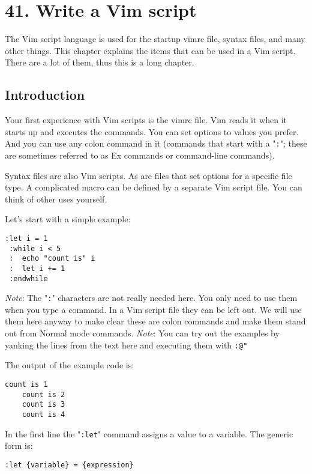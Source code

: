 \section{41. Write a Vim script}
\label{Write a Vim script}
The Vim script language is used for the startup vimrc file, syntax files, and many other things.
This chapter explains the items that can be used in a Vim script.
There are a lot of them, thus this is a long chapter.
\subsection{Introduction}
\label{vim-script-intro}
\label{script}
Your first experience with Vim scripts is the vimrc file.
Vim reads it when it starts up and executes the commands.
You can set options to values you prefer.
And you can use any colon command in it (commands that start with a "\texttt{:}"; these are sometimes referred to as Ex commands or command-line commands).

Syntax files are also Vim scripts.
As are files that set options for a specific file type.
A complicated macro can be defined by a separate Vim script file.
You can think of other uses yourself.

Let's start with a simple example:

\begin{Verbatim}[samepage=true]
 :let i = 1
 :while i < 5
 :  echo "count is" i
 :  let i += 1
 :endwhile
\end{Verbatim}

\emph{Note}: The "\texttt{:}" characters are not really needed here.
You only need to use them when you type a command.
In a Vim script file they can be left out.
We will use them here anyway to make clear these are colon commands and make them stand out from Normal mode commands.
\emph{Note}: You can try out the examples by yanking the lines from the text here and executing them with \texttt{:@"}

The output of the example code is:

\begin{Verbatim}[samepage=true]
    count is 1
    count is 2
    count is 3
    count is 4
\end{Verbatim}

In the first line the "\texttt{:let}" command assigns a value to a variable.
The generic form is:

\begin{Verbatim}[samepage=true]
 :let {variable} = {expression}
\end{Verbatim}

